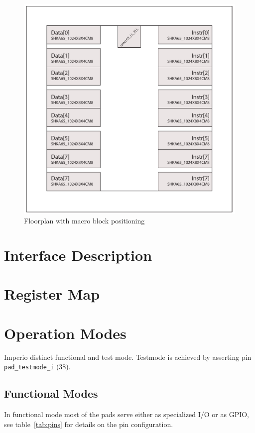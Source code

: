 \begin{figure}[h]
  \centering
  \includegraphics[width=\linewidth]{./figures/floorplan}
  \caption{Floorplan with macro block positioning}
  \label{fig:floorplan}
\end{figure}

\section{Interface Description}

\section{Register Map}

\section{Operation Modes}
Imperio distinct functional and test mode. Testmode is achieved by asserting pin \verb+pad_testmode_i+ (38).
\subsection{Functional Modes}
  In functional mode most of the pads serve either as specialized I/O or as GPIO, see table~\ref{tab:pins} for details on the pin configuration.

